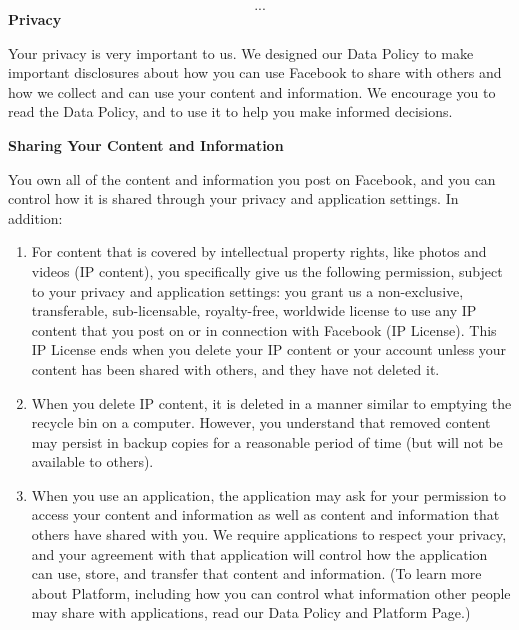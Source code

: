 \documentclass[showtrims, oldfontcommands]{kthesis}
\begin{document}
\begin{appendices}
    \begin{quote_tos}
        \[...\]
        \textbf{Privacy}

        Your privacy is very important to us. We designed our Data Policy to make important 
        disclosures about how you can use Facebook to share with others and how we collect 
        and can use your content and information. We encourage you to read the Data Policy, 
        and to use it to help you make informed decisions. 

        \vspace{\baselineskip}

        \textbf{Sharing Your Content and Information}

        You own all of the content and information you post on Facebook, and you can control 
        how it is shared through your privacy and application settings. In addition:

        \begin{enumerate}
            \item For content that is covered by intellectual property rights, like photos 
            and videos (IP content), you specifically give us the following permission, 
            subject to your privacy and application settings: you grant us a non-exclusive, 
            transferable, sub-licensable, royalty-free, worldwide license to use any IP 
            content that you post on or in connection with Facebook (IP License). This IP 
            License ends when you delete your IP content or your account unless your content 
            has been shared with others, and they have not deleted it.
    
            \item When you delete IP content, it is deleted in a manner similar to emptying 
            the recycle bin on a computer. However, you understand that removed content 
            may persist in backup copies for a reasonable period of time (but will not be 
            available to others).
    
            \item When you use an application, the application may ask for your permission 
            to access your content and information as well as content and information that 
            others have shared with you.  We require applications to respect your privacy, 
            and your agreement with that application will control how the application can 
            use, store, and transfer that content and information.  (To learn more about 
            Platform, including how you can control what information other people may share 
            with applications, read our Data Policy and Platform Page.)
    

\end{enumerate}
\end{quote_tos}
\end{appendices}
\end{document}
